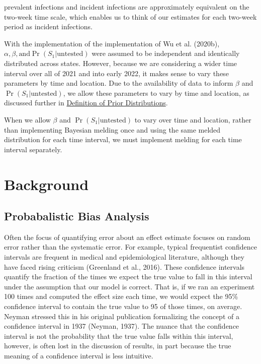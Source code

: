 \documentclass[12pt,twoside]{smiththesis}
\begin{document}
prevalent infections and incident infections are approximately equivalent on the two-week time scale, which enables us to think of our estimates for each two-week period as incident infections.

With the implementation of the implementation of Wu et al. (2020b), \(\alpha, \beta, \text{and} \Pr(S_1|\text{untested})\) were assumed to be independent and identically distributed across states. However, because we are considering a wider time interval over all of 2021 and into early 2022, it makes sense to vary these parameters by time and location. Due to the availability of data to inform \(\beta\) and \(\Pr(S_1|\text{untested})\), we allow these parameters to vary by time and location, as discussed further in \protect\hyperlink{defpriors}{Definition of Prior Distributions}.

When we allow \(\beta\) and \(\Pr(S_1|\text{untested})\) to vary over time and location, rather than implementing Bayesian melding once and using the same melded distribution for each time interval, we must implement melding for each time interval separately.

\hypertarget{background}{%
\chapter{Background}\label{background}}

\hypertarget{probabalistic-bias-analysis}{%
\section{Probabalistic Bias Analysis}\label{probabalistic-bias-analysis}}

Often the focus of quantifying error about an effect estimate focuses on random error rather than the systematic error. For example, typical frequentist confidence intervals are frequent in medical and epidemiological literature, although they have faced rising criticism (Greenland et al., 2016). These confidence intervals quantify the fraction of the times we expect the true value to fall in this interval under the assumption that our model is correct. That is, if we ran an experiment 100 times and computed the effect size each time, we would expect the 95\% confidence interval to contain the true value to 95 of those times, on average. Neyman stressed this in his original publication formalizing the concept of a confidence interval in 1937 (Neyman, 1937). The nuance that the confidence interval is not the probability that the true value falls within this interval, however, is often lost in the discussion of results, in part because the true meaning of a confidence interval is less intuitive.
\end{document}
